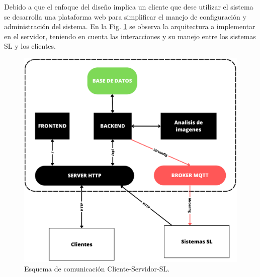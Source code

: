 Debido a que el enfoque del diseño implica un cliente que dese utilizar el sistema se desarrolla una plataforma web para simplificar el manejo de configuración y administración del sistema. En la Fig. \ref{fig:esquema-cliente-servidor-sl} se observa la arquitectura a implementar en el servidor, teniendo en cuenta las interacciones y su manejo entre los sistemas SL y los clientes.
\begin{figure}
    \centering
    \includegraphics[width=.4\textwidth]{imgs/server-clientes-barreras.png}
    \caption{Esquema de comunicación Cliente-Servidor-SL.}
    \label{fig:esquema-cliente-servidor-sl}
\end{figure}

